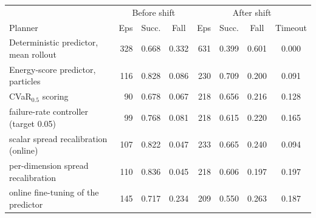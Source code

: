 \begin{tabular}{lrcc|rccc}
\toprule
 & \multicolumn{3}{c}{Before shift} & \multicolumn{4}{c}{After shift} \\
Planner & Eps & Succ. & Fall & Eps & Succ. & Fall & Timeout \\
\midrule
Deterministic predictor, mean rollout & 328 & 0.668 & 0.332 & 631 & 0.399 & 0.601 & 0.000 \\
Energy-score predictor, particles & 116 & 0.828 & 0.086 & 230 & 0.709 & 0.200 & 0.091 \\
\quad CVaR$_{0.5}$ scoring & 90 & 0.678 & 0.067 & 218 & 0.656 & 0.216 & 0.128 \\
\quad failure-rate controller (target 0.05) & 99 & 0.768 & 0.081 & 218 & 0.615 & 0.220 & 0.165 \\
\quad scalar spread recalibration (online) & 107 & 0.822 & 0.047 & 233 & 0.665 & 0.240 & 0.094 \\
\quad per-dimension spread recalibration & 110 & 0.836 & 0.045 & 218 & 0.606 & 0.197 & 0.197 \\
\quad online fine-tuning of the predictor & 145 & 0.717 & 0.234 & 209 & 0.550 & 0.263 & 0.187 \\
\bottomrule
\end{tabular}
